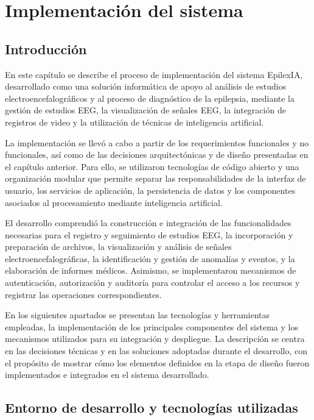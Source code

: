 \chapter{Implementación del sistema}
\label{cap:implementacion-sistema}

\section{Introducción}
\label{introduccion}

En este capítulo se describe el proceso de implementación del sistema
EpilexIA, desarrollado como una solución informática de apoyo al
análisis de estudios electroencefalográficos y al proceso de diagnóstico
de la epilepsia, mediante la gestión de estudios EEG,
la visualización de señales EEG, la integración de registros de video
y la utilización de técnicas de inteligencia artificial.

La implementación se llevó a cabo a partir de los requerimientos
funcionales y no funcionales, así como de las decisiones arquitectónicas
y de diseño presentadas en el capítulo anterior. Para ello, se utilizaron
tecnologías de código abierto y una organización modular que permite
separar las responsabilidades de la interfaz de usuario, los servicios
de aplicación, la persistencia de datos y los componentes asociados
al procesamiento mediante inteligencia artificial.

El desarrollo comprendió la construcción e integración de las
funcionalidades necesarias para el registro y seguimiento de estudios
EEG, la incorporación y preparación de archivos, la visualización
y análisis de señales electroencefalográficas, la identificación
y gestión de anomalías y eventos, y la elaboración de informes
médicos. Asimismo, se implementaron mecanismos de autenticación,
autorización y auditoría para controlar el acceso a los recursos
y registrar las operaciones correspondientes.

En los siguientes apartados se presentan las tecnologías y herramientas
empleadas, la implementación de los principales componentes del sistema
y los mecanismos utilizados para su integración y despliegue.
La descripción se centra en las decisiones técnicas y en las soluciones
adoptadas durante el desarrollo, con el propósito de mostrar cómo
los elementos definidos en la etapa de diseño fueron implementados
e integrados en el sistema desarrollado.


\section{Entorno de desarrollo y tecnologías utilizadas}
\label{entorno-desarrollo-tecnologias-utilizadas}

